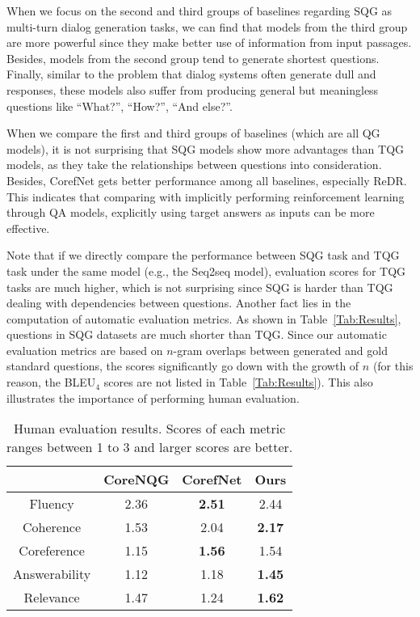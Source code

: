\documentclass[11pt,a4paper]{article}
\begin{document}
When we focus on the second and third groups of baselines regarding SQG as multi-turn dialog generation tasks, we can find that models from the third group are more powerful since they make better use of information from input passages. Besides, models from the second group tend to generate shortest questions. Finally, similar to the problem that dialog systems often generate dull and responses, these models also suffer from producing general but meaningless questions like ``What?'', ``How?'', ``And else?''.

When we compare the first and third groups of baselines (which are all QG models), it is not surprising that SQG models show more advantages than TQG models, as they take the relationships between questions into consideration. Besides, CorefNet gets better performance among all baselines, especially ReDR. This indicates that comparing with implicitly performing reinforcement learning through QA models, explicitly using target answers as inputs can be more effective.

Note that if we directly compare the performance between SQG task and TQG task under the same model (e.g., the Seq2seq model), evaluation scores for TQG tasks are much higher, which is not surprising since SQG is harder than TQG dealing with dependencies between questions. 
Another fact lies in the computation of automatic evaluation metrics. As shown in Table~\ref{Tab:Results}, questions in SQG datasets are much shorter than TQG. Since our automatic evaluation metrics are based on $n$-gram overlaps between generated and gold standard questions, the scores significantly go down with the growth of $n$ (for this reason, the BLEU$_4$ scores are not listed in Table~\ref{Tab:Results}). This also illustrates the importance of performing human evaluation. 

\begin{table}[t!]
	\centering
	\begin{tabular}{cccc}
		\hline
		& CoreNQG & CorefNet      & Ours          \\ \hline
		Fluency      & 2.36    & \textbf{2.51} & 2.44          \\
		Coherence    & 1.53    & 2.04		   & \textbf{2.17} \\
		Coreference  & 1.15    & \textbf{1.56} & 1.54 \\
		Answerability & 1.12    & 1.18          & \textbf{1.45} \\
		Relevance    & 1.47    & 1.24          & \textbf{1.62} \\ \hline
	\end{tabular}
	\caption{Human evaluation results. Scores of each metric ranges between 1 to 3 and larger scores are better.}
	\label{Tab:Human}
\end{table}
\end{document}
